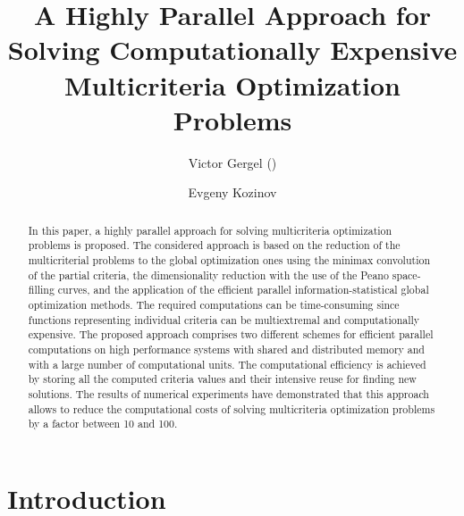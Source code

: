 \documentclass[runningheads]{llncs}
\begin{document}
\title{A Highly Parallel Approach for Solving Computationally Expensive Multicriteria Optimization Problems}


\author{Victor Gergel (\Envelope) \and Evgeny Kozinov }





\maketitle

\begin{abstract}
In this paper, a highly parallel approach for solving multicriteria optimization problems is proposed. The considered approach is based on the reduction of the multicriterial problems to the global optimization ones using the minimax convolution of the partial criteria, the dimensionality reduction with the use of the Peano space-filling curves, and the application of the efficient parallel information-statistical global optimization methods. The required computations can be time-consuming since functions representing individual criteria can be multiextremal and computationally expensive. The proposed approach comprises two different schemes for efficient parallel computations on high performance systems with shared and distributed memory and with a large number of computational units. The computational efficiency is achieved by storing all the computed criteria values and their intensive reuse for finding new solutions. The results of numerical experiments have demonstrated that this approach allows to reduce the computational costs of solving multicriteria optimization problems by a factor between 10 and 100. 
\end{abstract}

\section{Introduction}
\label{sec:1}
\end{document}
